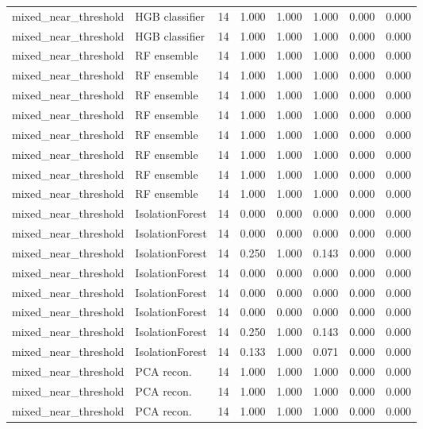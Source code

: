 {\begin{longtable}{llrrrrrr}
mixed\_near\_threshold & HGB classifier & 14 & 1.000 & 1.000 & 1.000 & 0.000 & 0.000 \\
mixed\_near\_threshold & HGB classifier & 14 & 1.000 & 1.000 & 1.000 & 0.000 & 0.000 \\
mixed\_near\_threshold & RF ensemble & 14 & 1.000 & 1.000 & 1.000 & 0.000 & 0.000 \\
mixed\_near\_threshold & RF ensemble & 14 & 1.000 & 1.000 & 1.000 & 0.000 & 0.000 \\
mixed\_near\_threshold & RF ensemble & 14 & 1.000 & 1.000 & 1.000 & 0.000 & 0.000 \\
mixed\_near\_threshold & RF ensemble & 14 & 1.000 & 1.000 & 1.000 & 0.000 & 0.000 \\
mixed\_near\_threshold & RF ensemble & 14 & 1.000 & 1.000 & 1.000 & 0.000 & 0.000 \\
mixed\_near\_threshold & RF ensemble & 14 & 1.000 & 1.000 & 1.000 & 0.000 & 0.000 \\
mixed\_near\_threshold & RF ensemble & 14 & 1.000 & 1.000 & 1.000 & 0.000 & 0.000 \\
mixed\_near\_threshold & RF ensemble & 14 & 1.000 & 1.000 & 1.000 & 0.000 & 0.000 \\
mixed\_near\_threshold & IsolationForest & 14 & 0.000 & 0.000 & 0.000 & 0.000 & 0.000 \\
mixed\_near\_threshold & IsolationForest & 14 & 0.000 & 0.000 & 0.000 & 0.000 & 0.000 \\
mixed\_near\_threshold & IsolationForest & 14 & 0.250 & 1.000 & 0.143 & 0.000 & 0.000 \\
mixed\_near\_threshold & IsolationForest & 14 & 0.000 & 0.000 & 0.000 & 0.000 & 0.000 \\
mixed\_near\_threshold & IsolationForest & 14 & 0.000 & 0.000 & 0.000 & 0.000 & 0.000 \\
mixed\_near\_threshold & IsolationForest & 14 & 0.000 & 0.000 & 0.000 & 0.000 & 0.000 \\
mixed\_near\_threshold & IsolationForest & 14 & 0.250 & 1.000 & 0.143 & 0.000 & 0.000 \\
mixed\_near\_threshold & IsolationForest & 14 & 0.133 & 1.000 & 0.071 & 0.000 & 0.000 \\
mixed\_near\_threshold & PCA recon. & 14 & 1.000 & 1.000 & 1.000 & 0.000 & 0.000 \\
mixed\_near\_threshold & PCA recon. & 14 & 1.000 & 1.000 & 1.000 & 0.000 & 0.000 \\
mixed\_near\_threshold & PCA recon. & 14 & 1.000 & 1.000 & 1.000 & 0.000 & 0.000 \\

\end{longtable}}
